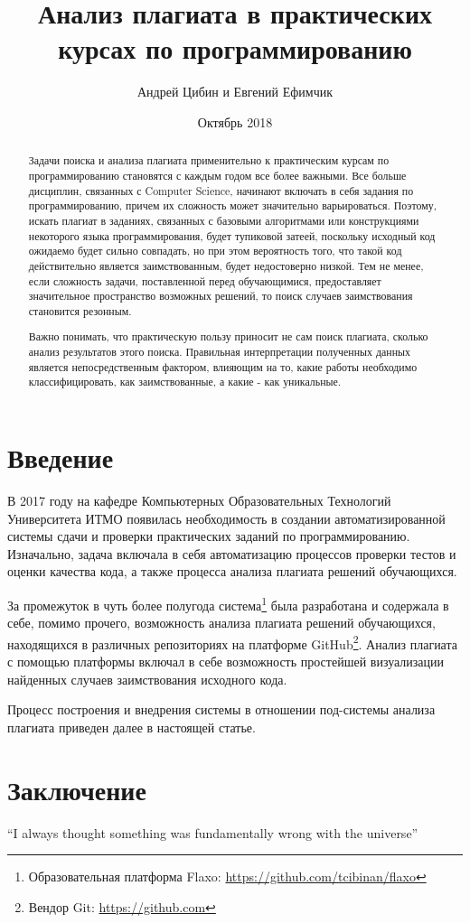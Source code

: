 \documentclass{article}
\title{Анализ плагиата в практических курсах по программированию}
\author{Андрей Цибин и Евгений Ефимчик}
\date{Октябрь 2018}
\begin{document}
\maketitle

\begin{abstract}
Задачи поиска и анализа плагиата применительно к практическим курсам по программированию становятся с каждым годом все более важными. Все больше дисциплин, связанных с Computer Science, начинают включать в себя задания по программированию, причем их сложность может значительно варьироваться. Поэтому, искать плагиат в заданиях, связанных с базовыми алгоритмами или конструкциями некоторого языка программирования, будет тупиковой затеей, поскольку исходный код ожидаемо будет сильно совпадать, но при этом вероятность того, что такой код действительно является заимствованным, будет недостоверно низкой. Тем не менее, если сложность задачи, поставленной перед обучающимися, предоставляет значительное пространство возможных решений, то поиск случаев заимствования становится резонным.

Важно понимать, что практическую пользу приносит не сам поиск плагиата, сколько анализ результатов этого поиска. Правильная интерпретации полученных данных является непосредственным фактором, влияющим на то, какие работы необходимо классифицировать, как заимствованные, а какие - как уникальные.
\end{abstract}

\section{Введение}

В 2017 году на кафедре Компьютерных Образовательных Технологий Университета ИТМО появилась необходимость в создании автоматизированной системы сдачи и проверки практических заданий по программированию. Изначально, задача включала в себя автоматизацию процессов проверки тестов и оценки качества кода, а также процесса анализа плагиата решений обучающихся.

За промежуток в чуть более полугода система\footnote{Образовательная платформа Flaxo: \url{https://github.com/tcibinan/flaxo}} была разработана и содержала в себе, помимо прочего, возможность анализа плагиата решений обучающихся, находящихся в различных репозиториях на платформе GitHub\footnote{Вендор Git: \url{https://github.com}}. Анализ плагиата с помощью платформы включал в себе возможность простейшей визуализации найденных случаев заимствования исходного кода.

Процесс построения и внедрения системы в отношении под-системы анализа плагиата приведен далее в настоящей статье.

\section{Заключение}
``I always thought something was fundamentally wrong with the universe'' \citep{adams1995hitchhiker}



\end{document}
